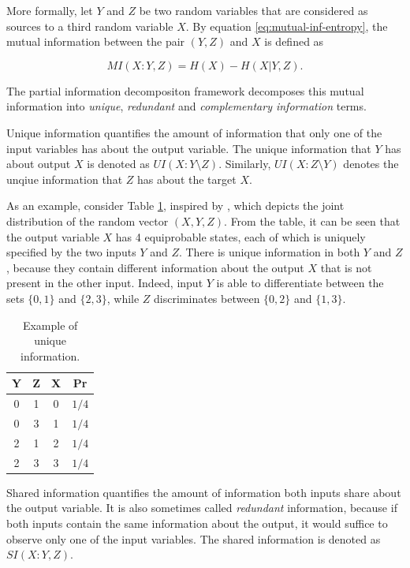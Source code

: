 \documentclass[12pt]{article}
\begin{document}
More formally, let $Y$ and $Z$ be two random variables that are considered as sources to a third random variable $X$. By equation \ref{eq:mutual-inf-entropy}, the mutual information between the pair $(Y,Z)$ and $X$ is defined as 

$$MI(X:Y,Z) = H(X) - H(X|Y,Z).$$

The partial information decompositon framework decomposes this mutual information into \textit{unique}, \textit{redundant} and \textit{complementary information} terms. 

Unique information quantifies the amount of information that only one of the input variables has about the output variable. The unique information that $Y$ has about output $X$ is denoted as $UI(X:Y \setminus Z)$. Similarly, $UI(X:Z \setminus Y)$ denotes the unqiue information that $Z$ has about the target $X$.

As an example, consider Table \ref{table:1}, inspired by \cite{pid-synergy}, which depicts the joint distribution of the random vector $(X,Y,Z)$. From the table, it can be seen that the output variable $X$ has 4 equiprobable states, each of which is uniquely specified by the two inputs $Y$ and $Z$. There is unique information in both $Y$ and $Z$, because they contain different information about the output $X$ that is not present in the other input. Indeed, input $Y$ is able to differentiate between the sets $\{0,1\}$ and $\{2,3\}$, while $Z$ discriminates between $\{0, 2\}$ and $\{1,3\}$.

\begin{table}[h!]
\centering
\begin{tabular}{|c c |c|c|}
	\hline
	Y & Z & X & Pr\\ 
	\hline
	0 & 1 & 0 & $1/4$ \\
	0 & 3 & 1 & $1/4$ \\
	2 & 1 & 2 & $1/4$ \\
	2 & 3 & 3 & $1/4$ \\
	\hline
\end{tabular}
\caption{Example of unique information.}
\label{table:1}
\end{table}

Shared information quantifies the amount of information both inputs share about the output variable. It is also sometimes called \textit{redundant} information, because if both inputs contain the same information about the output, it would suffice to observe only one of the input variables. The shared information is denoted as $SI(X:Y,Z)$.
\end{document}
